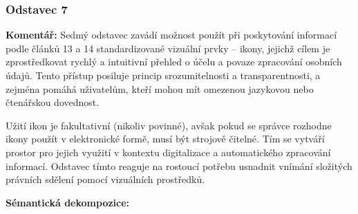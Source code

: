 
\subsubsection{Odstavec 7}
\label{sec:odstavec-7}
\begin{displayquote}  \cite{clanek12}
\end{displayquote}

\noindent \textbf{Komentář:}
Sedmý odstavec zavádí možnost použít při poskytování informací podle článků 13 a 14 standardizované vizuální prvky – ikony, jejichž cílem je zprostředkovat rychlý a intuitivní přehled o účelu a povaze zpracování osobních údajů. Tento přístup posiluje princip srozumitelnosti a transparentnosti, a zejména pomáhá uživatelům, kteří mohou mít omezenou jazykovou nebo čtenářskou dovednost.

Užití ikon je fakultativní (nikoliv povinné), avšak pokud se správce rozhodne ikony použít v elektronické formě, musí být strojově čitelné. Tím se vytváří prostor pro jejich využití v kontextu digitalizace a automatického zpracování informací. Odstavec tímto reaguje na rostoucí potřebu usnadnit vnímání složitých právních sdělení pomocí vizuálních prostředků.

\vspace{1em}

\noindent \textbf{Sémantická dekompozice:}

